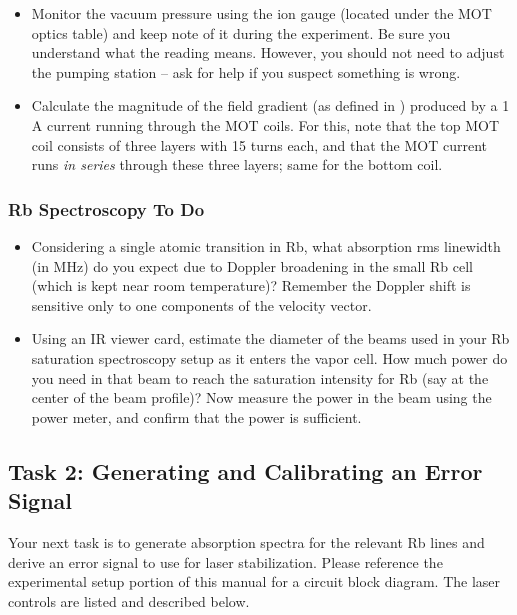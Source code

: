 \documentclass{../lab}
\begin{document}
\begin{itemize}
    \item Monitor the vacuum pressure using the ion gauge (located under the MOT optics table) and keep note of it during the experiment. Be sure you understand what the reading means. However, you should not need to adjust the pumping station – ask for help if you suspect something is wrong.

    \item Calculate the magnitude of the field gradient (as defined in ) produced by a 1 A current running through the MOT coils. For this, note that the top MOT coil consists of three layers with 15 turns each, and that the MOT current runs \emph{in series} through these three layers; same for the bottom coil.
\end{itemize}

\subsubsection{Rb Spectroscopy To Do}

\begin{itemize}
    \item Considering a single atomic transition in Rb, what absorption rms linewidth (in MHz) do you expect due to Doppler broadening in the small Rb cell (which is kept near room temperature)? Remember the Doppler shift is sensitive only to one components of the velocity vector.

    \item Using an IR viewer card, estimate the diameter of the beams used in your Rb saturation spectroscopy setup as it enters the vapor cell. How much power do you need in that beam to reach the saturation intensity for Rb (say at the center of the beam profile)? Now measure the power in the beam using the power meter, and confirm that the power is sufficient.
\end{itemize}

\subsection{Task 2: Generating and Calibrating an Error Signal}

Your next task is to generate absorption spectra for the relevant Rb lines and derive an error signal to use for laser stabilization. Please reference the experimental setup portion of this manual for a circuit block diagram. The laser controls are listed and described below.
\end{document}
